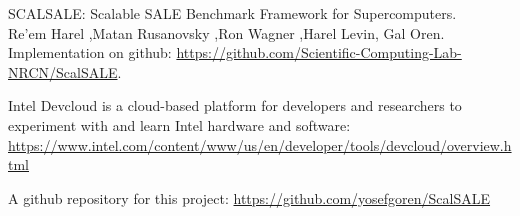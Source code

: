 \begin{thebibliography}{1}
SCALSALE: Scalable SALE Benchmark Framework for Supercomputers.\\
Re'em Harel ,Matan Rusanovsky ,Ron Wagner ,Harel Levin, Gal Oren.\\
Implementation on github: \url{https://github.com/Scientific-Computing-Lab-NRCN/ScalSALE}.

Intel Devcloud is a cloud-based platform for developers and researchers to experiment with and learn Intel hardware and software:
\url{https://www.intel.com/content/www/us/en/developer/tools/devcloud/overview.html}

A github repository for this project: \url{https://github.com/yosefgoren/ScalSALE}
\end{thebibliography}
